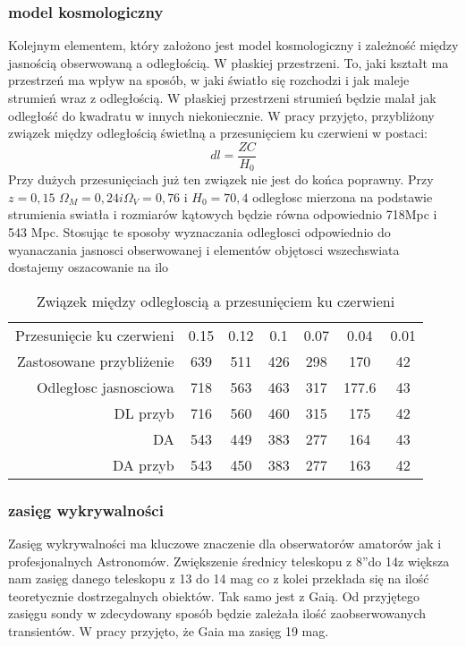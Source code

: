 \documentclass[polish,12pt]{pracamgr}
\begin{document}
\subsubsection{model kosmologiczny}
Kolejnym elementem, który założono jest model kosmologiczny i zależność między jasnością obserwowaną a odległością. W płaskiej przestrzeni. To, jaki kształt ma przestrzeń ma wpływ na sposób, w jaki światło się rozchodzi i jak maleje strumień wraz z odległością. W płaskiej przestrzeni strumień będzie malał jak odległość do kwadratu w innych niekoniecznie. W pracy przyjęto, przybliżony związek między odległością świetlną a przesunięciem ku czerwieni w postaci:
\begin{equation}
dl = \frac{ZC}{H_0}
\end{equation}
Przy dużych przesunięciach już ten związek nie jest do końca poprawny. Przy $z = 0,15$  $\Omega_M  = 0,24 i \Omega_V = 0,76$ i $H_0 = 70,4$ odległosc mierzona na podstawie strumienia swiatła i rozmiarów kątowych będzie równa odpowiednio 718Mpc i 543 Mpc. Stosując te sposoby wyznaczania odległosci odpowiednio do wyanaczania jasnosci obserwowanej i elementów objętosci wszechswiata dostajemy oszacowanie na ilo%
\begin{table}
	\caption{Związek między odległoscią a przesunięciem ku czerwieni}
	\label{tab 34}
\begin{tabular}{r|c|c|c|c|c|c}
Przesunięcie ku czerwieni &	0.15&  0.12& 0.1&	0.07&	0.04&	0.01 \\
Zastosowane przybliżenie&	639&	511&426& 298&170&42 \\
Odległosc jasnosciowa     &	718&	563&463& 317&177.6&43 \\
DL przyb		         & 	716&  560&460& 315& 175&42 \\
DA			         &	543&	449&383&277&164&43 \\
DA przyb		         &	543&	450&383&277&163&42 \\
\end{tabular}
	\end{table}

\subsubsection{zasięg wykrywalności}
Zasięg wykrywalności ma kluczowe znaczenie dla obserwatorów amatorów jak i profesjonalnych Astronomów. Zwiększenie średnicy teleskopu z 8”do 14z większa nam zasięg danego teleskopu z 13 do 14 mag co z kolei przekłada się na ilość teoretycznie dostrzegalnych obiektów. Tak samo jest z Gaią. Od przyjętego zasięgu sondy w zdecydowany sposób będzie zależała ilość zaobserwowanych transientów. W pracy przyjęto, że Gaia ma zasięg 19 mag.
\end{document}
